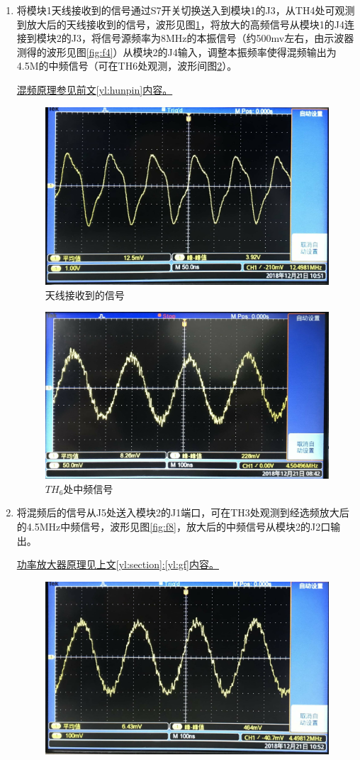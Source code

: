 \documentclass[12pt]{article}%
\numberwithin{equation}{section}
\begin{document}
\begin{enumerate}[1.]\addtolength{\itemsep}{-1.5ex}
\item 将模块1天线接收到的信号通过S7开关切换送入到模块1的J3，从TH4处可观测到放大后的天线接收到的信号，波形见图\ref{fig:f7}，将放大的高频信号从模块1的J4连接到模块2的J3，将信号源频率为8MHz的本振信号（约500mv左右，由示波器测得的波形见图\ref{fig:f4}）从模块2的J4输入，调整本振频率使得混频输出为4.5M的中频信号（可在TH6处观测，波形间图\ref{fig:f11}）。\par\uline{混频原理参见前文\ref{yl:hunpin}内容。}
 \begin{figure}[htbp]
  \centering
  \includegraphics[width=.45\textwidth]{gaopin6/gaopin609.jpg}
  \caption{天线接收到的信号 } 
  \label{fig:f7} 
\end{figure}
 \begin{figure}[htbp]
  \centering
  \includegraphics[width=.45\textwidth]{gaopin6/gaopin610.jpg}
  \caption{$TH_6$处中频信号 } 
  \label{fig:f11} 
\end{figure}
\item 将混频后的信号从J5处送入模块2的J1端口，可在TH3处观测到经选频放大后的4.5MHz中频信号，波形见图\ref{fig:f8}，放大后的中频信号从模块2的J2口输出。\par\uline{功率放大器原理见上文\ref{yl:section}:\ref{yl:gf}内容。}
 \begin{figure}[htbp]
  \centering
  \includegraphics[width=.45\textwidth]{gaopin6/gaopin602.jpg}

\end{figure}
\end{enumerate}
\end{document}
